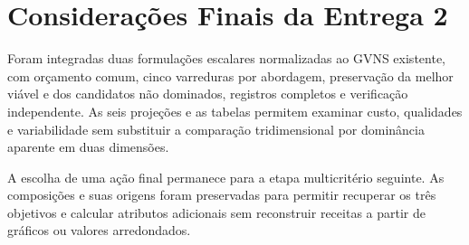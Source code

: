 \section{Considerações Finais da Entrega 2}

Foram integradas duas formulações escalares normalizadas ao GVNS existente,
com orçamento comum, cinco varreduras por abordagem, preservação da melhor
viável e dos candidatos não dominados, registros completos e verificação
independente. As seis projeções e as tabelas permitem examinar custo,
qualidades e variabilidade sem substituir a comparação tridimensional por
dominância aparente em duas dimensões.

A escolha de uma ação final permanece para a etapa multicritério seguinte.
As composições e suas origens foram preservadas para permitir recuperar os
três objetivos e calcular atributos adicionais sem reconstruir receitas
a partir de gráficos ou valores arredondados.
